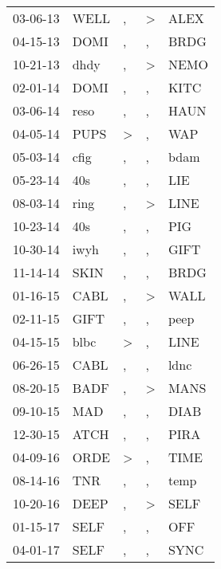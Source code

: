 \begin{supertabular}{lllll}
 03-06-13 &   WELL &                , &     \textgreater &   ALEX \\
 04-15-13 &   DOMI &                , &                , &   BRDG \\
 10-21-13 &   dhdy &                , &     \textgreater &   NEMO \\
 02-01-14 &   DOMI &                , &                , &   KITC \\
 03-06-14 &   reso &                , &                , &   HAUN \\
 04-05-14 &   PUPS &     \textgreater &                , &    WAP \\
 05-03-14 &   cfig &                , &                , &   bdam \\
 05-23-14 &    40s &                , &                , &    LIE \\
 08-03-14 &   ring &                , &     \textgreater &   LINE \\
 10-23-14 &    40s &                , &                , &    PIG \\
 10-30-14 &   iwyh &                , &                , &   GIFT \\
 11-14-14 &   SKIN &                , &                , &   BRDG \\
 01-16-15 &   CABL &                , &     \textgreater &   WALL \\
 02-11-15 &   GIFT &                , &                , &   peep \\
 04-15-15 &   blbc &     \textgreater &                , &   LINE \\
 06-26-15 &   CABL &                , &                , &   ldnc \\
 08-20-15 &   BADF &                , &     \textgreater &   MANS \\
 09-10-15 &    MAD &                , &                , &   DIAB \\
 12-30-15 &   ATCH &                , &                , &   PIRA \\
 04-09-16 &   ORDE &     \textgreater &                , &   TIME \\
 08-14-16 &    TNR &                , &                , &   temp \\
 10-20-16 &   DEEP &                , &     \textgreater &   SELF \\
 01-15-17 &   SELF &                , &                , &    OFF \\
 04-01-17 &   SELF &                , &                , &   SYNC \\

\end{supertabular}
